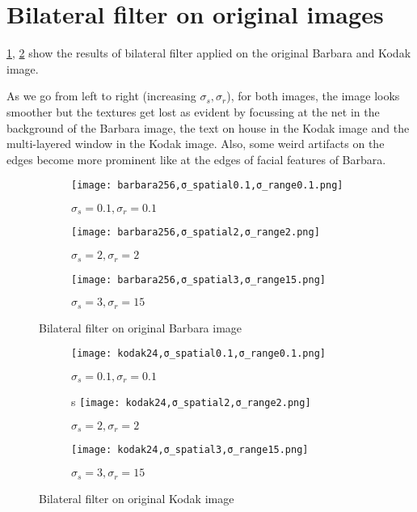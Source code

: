 \documentclass[a4paper, landscape]{article}
\begin{document}
\section{Bilateral filter on original images}
\ref{fig:bs}, \ref{fig:ks} show the results of bilateral filter applied on the original Barbara and Kodak image.

As we go from left to right (increasing $\sigma_s, \sigma_r$), for both images, the image looks smoother but the textures get lost as evident by focussing at the net in the background of the Barbara image, the text on house in the Kodak image and the multi-layered window in  the Kodak image. Also, some weird artifacts on the edges become more prominent like at the edges of facial features of Barbara.
\begin{figure}
    \centering
    \begin{subfigure}{0.33\linewidth}
        \centering
        \texttt{[image: barbara256,σ\_spatial0.1,σ\_range0.1.png]}
        \caption{$\sigma_s=0.1, \sigma_r=0.1$}
    \end{subfigure}
    \begin{subfigure}{0.33\linewidth}
        \centering
        \texttt{[image: barbara256,σ\_spatial2,σ\_range2.png]}
        \caption{$\sigma_s=2, \sigma_r=2$}
    \end{subfigure}
    \begin{subfigure}{0.33\linewidth}
        \centering
        \texttt{[image: barbara256,σ\_spatial3,σ\_range15.png]}
        \caption{$\sigma_s=3, \sigma_r=15$}
    \end{subfigure}
    \caption{Bilateral filter on original Barbara image}
    \label{fig:bs}
\end{figure}
\begin{figure}
    \centering
    \begin{subfigure}{0.33\linewidth}
        \centering
        \texttt{[image: kodak24,σ\_spatial0.1,σ\_range0.1.png]}
        \caption{$\sigma_s=0.1, \sigma_r=0.1$}
    \end{subfigure}
    \begin{subfigure}{0.33\linewidth}s
        \centering
        \texttt{[image: kodak24,σ\_spatial2,σ\_range2.png]}
        \caption{$\sigma_s=2, \sigma_r=2$}
    \end{subfigure}
    \begin{subfigure}{0.33\linewidth}
        \centering
        \texttt{[image: kodak24,σ\_spatial3,σ\_range15.png]}
        \caption{$\sigma_s=3, \sigma_r=15$}
    \end{subfigure}
    \caption{Bilateral filter on original Kodak image}
    \label{fig:ks}
\end{figure}
\end{document}
